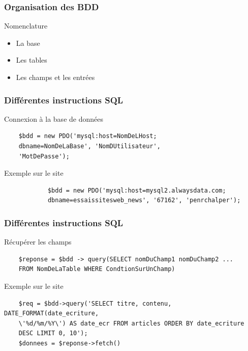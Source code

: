 \documentclass[handout]{beamer}
\begin{document}
\begin{frame}
	\frametitle{Organisation des BDD}
	\begin{block}{Nomenclature}
		\begin{itemize}
			\item La base
			\item Les tables
			\item Les champs et les entrées
		\end{itemize}
	\end{block}
\end{frame}

\begin{frame}[fragile]
	\frametitle{Différentes instructions SQL}
	\begin{block}{Connexion à la base de données}
	\begin{verbatim}
	$bdd = new PDO('mysql:host=NomDeLHost;
	dbname=NomDeLaBase', 'NomDUtilisateur', 
	'MotDePasse');
	\end{verbatim}
	\end{block}

	\begin{exampleblock}{Exemple sur le site}
		\begin{verbatim}
			$bdd = new PDO('mysql:host=mysql2.alwaysdata.com;
			dbname=essaissitesweb_news', '67162', 'penrchalper');
		\end{verbatim}
	\end{exampleblock}
\end{frame}

\begin{frame}[fragile]
	\frametitle{Différentes instructions SQL}
	\begin{block}{Récupérer les champs}
	\begin{verbatim}
	$reponse = $bdd -> query(SELECT nomDuChamp1 nomDuChamp2 ... 
	FROM NomDeLaTable WHERE CondtionSurUnChamp)
	\end{verbatim}
	\end{block}

	\begin{exampleblock}{Exemple sur le site}
	\begin{verbatim}
	$req = $bdd->query('SELECT titre, contenu, DATE_FORMAT(date_ecriture,
	\'%d/%m/%Y\') AS date_ecr FROM articles ORDER BY date_ecriture
	DESC LIMIT 0, 10');
	$donnees = $reponse->fetch()
	\end{verbatim}
	\end{exampleblock}
\end{frame}
 
\end{document}
